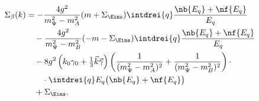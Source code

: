 \begin{equation*}
\begin{split}
  \Sigma_\beta(k)&=-\frac{4g^2}{m_\Psi^2-m_A^2}(m+\Sigma_\Eins)
  \intdrei{q}\frac{\nb{E_q}+\nf{E_q}}{E_q}\\
  &\quad-\frac{4g^2}{m_\Psi^2-m_B^2}(-m-\Sigma_\Eins)
  \intdrei{q}\frac{\nb{E_q}+\nf{E_q}}{E_q}\\
  &\quad-8g^2\left(k_0\gamma_0+\tfrac{1}{3}\vec k\vec\gamma\right)
  \left(\frac{1}{(m_\Psi^2-m_A^2)^2}
        +\frac{1}{(m_\Psi^2-m_B^2)^2}\right)
  \cdot\\&\quad\quad\cdot
  \intdrei{q}E_q\bigl(\nb{E_q}+\nf{E_q}\bigr)\\
  &\quad+\Sigma_\Eins.
\end{split}
\end{equation*}

